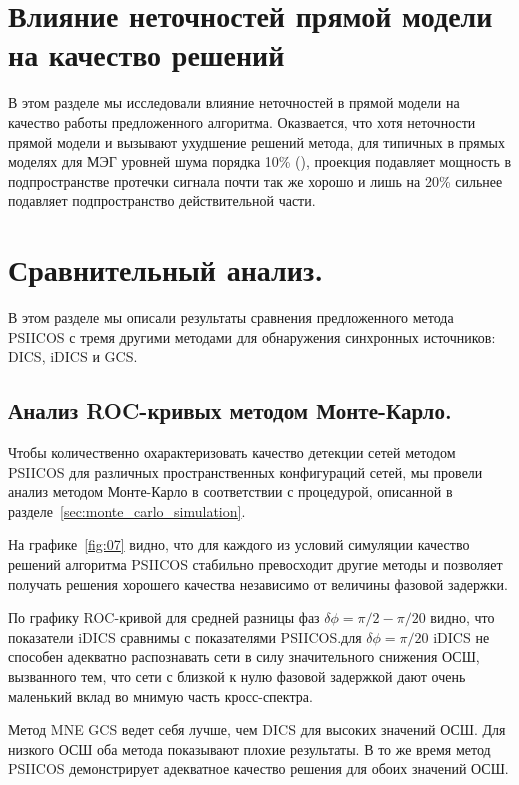 \section{Влияние неточностей прямой модели на качество решений}\label{sec:forward_model_errors_effect}
В этом разделе мы исследовали влияние неточностей в прямой модели
на качество работы предложенного алгоритма. Оказвается, что хотя неточности прямой
модели и вызывают ухудшение решений метода, для типичных в прямых моделях для МЭГ
уровней шума порядка 10\% (\cite{Mosher1999}), проекция подавляет мощность
в подпространстве протечки сигнала почти так же хорошо и лишь на 20\% сильнее подавляет
подпространство действительной части.

\section{Сравнительный анализ.}

 В этом разделе мы описали результаты сравнения предложенного метода PSIICOS
 с тремя другими методами для обнаружения синхронных источников: DICS, iDICS и GCS.\@

\subsection{Анализ ROC-кривых методом Монте-Карло.}
Чтобы количественно охарактеризовать качество детекции сетей методом PSIICOS для различных
пространственных конфигураций сетей, мы провели анализ методом Монте-Карло в соответствии
с процедурой, описанной в разделе~\ref{sec:monte_carlo_simulation}.

На графике~\ref{fig:07} видно, что для каждого из условий симуляции качество решений
алгоритма PSIICOS стабильно превосходит другие методы и позволяет получать решения хорошего
качества независимо от величины фазовой задержки.

По графику ROC-кривой для средней разницы фаз $\delta\phi=\pi/2 - \pi/20$ видно, что
показатели iDICS сравнимы с показателями PSIICOS. для $\delta\phi = \pi/20$ iDICS
не способен адекватно распознавать сети в силу значительного снижения ОСШ, вызванного
тем, что сети с близкой к нулю фазовой задержкой дают очень маленький вклад во
мнимую часть кросс-спектра.

Метод MNE GCS ведет себя лучше, чем DICS для высоких значений ОСШ. Для низкого ОСШ
оба метода показывают плохие результаты. В то же время метод PSIICOS демонстрирует
адекватное качество решения для обоих значений ОСШ.

